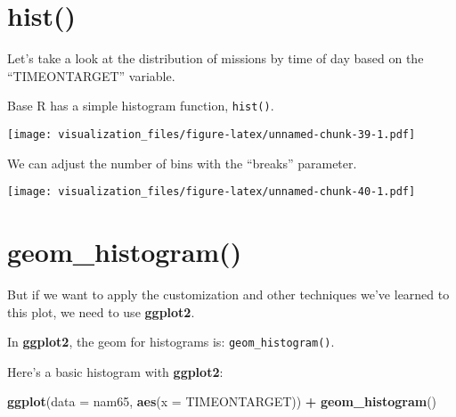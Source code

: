 \documentclass[oneside]{memoir}
\newenvironment{Shaded}{\begin{snugshade}}{\end{snugshade}}
\newcommand{\KeywordTok}[1]{\textcolor[rgb]{0.13,0.29,0.53}{\textbf{#1}}}
\newcommand{\DataTypeTok}[1]{\textcolor[rgb]{0.13,0.29,0.53}{#1}}
\newcommand{\DecValTok}[1]{\textcolor[rgb]{0.00,0.00,0.81}{#1}}
\newcommand{\StringTok}[1]{\textcolor[rgb]{0.31,0.60,0.02}{#1}}
\newcommand{\OperatorTok}[1]{\textcolor[rgb]{0.81,0.36,0.00}{\textbf{#1}}}
\newcommand{\NormalTok}[1]{#1}
\theoremstyle{definition}
\theoremstyle{definition}
\theoremstyle{definition}
\theoremstyle{remark}
\begin{document}
\section{hist()}\label{hist}

Let's take a look at the distribution of missions by time of day based
on the ``TIMEONTARGET'' variable.

Base R has a simple histogram function, \texttt{hist()}.

\begin{Shaded}
\end{Shaded}

\texttt{[image: visualization\_files/figure-latex/unnamed-chunk-39-1.pdf]}

We can adjust the number of bins with the ``breaks'' parameter.

\begin{Shaded}
\end{Shaded}

\texttt{[image: visualization\_files/figure-latex/unnamed-chunk-40-1.pdf]}

\section{geom\_histogram()}\label{geom_histogram}

But if we want to apply the customization and other techniques we've
learned to this plot, we need to use \textbf{ggplot2}.

In \textbf{ggplot2}, the geom for histograms is:
\texttt{geom\_histogram()}.

Here's a basic histogram with \textbf{ggplot2}:

\begin{Shaded}
\begin{Highlighting}[]
\KeywordTok{ggplot}\NormalTok{(}\DataTypeTok{data =}\NormalTok{ nam65, }\KeywordTok{aes}\NormalTok{(}\DataTypeTok{x =}\NormalTok{ TIMEONTARGET)) }\OperatorTok{+}
\StringTok{  }\KeywordTok{geom_histogram}\NormalTok{()}
\end{Highlighting}
\end{Shaded}
\end{document}
